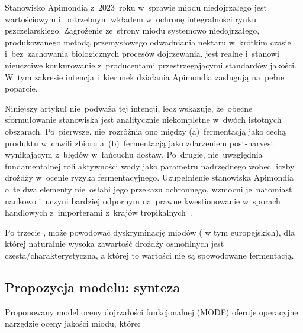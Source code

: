 Stanowisko Apimondia z~2023~roku w~sprawie miodu niedojrzałego
jest wartościowym i~potrzebnym wkładem w~ochronę integralności
rynku pszczelarskiego. Zagrożenie ze~strony miodu systemowo
niedojrzałego, produkowanego metodą przemysłowego
odwadniania nektaru w~krótkim czasie i~bez~zachowania
biologicznych procesów dojrzewania, jest realne i~stanowi
nieuczciwe konkurowanie z~producentami przestrzegającymi
standardów jakości. W~tym zakresie intencja i~kierunek
działania Apimondia zasługują na~pełne poparcie.

Niniejszy artykuł nie~podważa tej intencji, lecz wskazuje,
że~obecne sformułowanie stanowiska jest analitycznie
niekompletne w~dwóch istotnych obszarach. Po~pierwsze,
nie~rozróżnia ono między (a)~fermentacją jako cechą
produktu w~chwili zbioru a~(b)~fermentacją jako zdarzeniem
post-harvest wynikającym z~błędów w~łańcuchu dostaw.
Po~drugie, nie~uwzględnia fundamentalnej roli aktywności
wody jako parametru nadrzędnego wobec liczby drożdży
w~ocenie ryzyka fermentacyjnego. Uzupełnienie stanowiska
Apimondia o~te dwa elementy nie~osłabi jego przekazu
ochronnego, wzmocni je~natomiast naukowo
i~uczyni bardziej odpornym na~prawne kwestionowanie
w~sporach handlowych z~importerami z~krajów
tropikalnych~\cite{ruegg1981,tadele2025,analytica2020}.

Po trzecie , może powodować dyskryminację miodów ( w tym europejskich), dla której naturalnie wysoka zawartość drożdży osmofilnych jest częsta/charakterystyczna, a której to wartości nie są spowodowane fermentacją. 

\subsection{Propozycja modelu: synteza}

Proponowany model oceny dojrzałości funkcjonalnej (MODF)
oferuje operacyjne narzędzie oceny jakości miodu, które:

